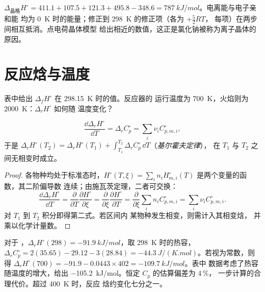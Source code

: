 \begin{example}[氯化钠]\label{ex:b2:reaction-enthalpy:nacl}
$\Delta_{\text{晶格}}H^\circ = 411.1 + 107.5 + 121.3 + 495.8 - 348.6 =
\qty{787}{kJ/mol}$。电离能与电子亲和能
均为 \qty{0}{K} 时的能量；修正到 \qty{298}{K} 的修正项（各为 $+\tfrac52RT$，
每项）在两步间相互抵消。点电荷晶体模型
给出相近的数值，这正是氯化钠被称为离子晶体的原因。
\end{example}

\section{反应焓与温度}

表中给出 $\Delta_f H^\circ$ 在 \qty{298.15}{K} 时的值。反应器的
运行温度为 \qty{700}{K}，火焰则为 \qty{2000}{K}：$\Delta_r H^\circ$ 如何随
温度变化？

\begin{theorem}[基尔霍夫定律]\label{thm:b2:reaction-enthalpy:kirchhoff}
\[
  \frac{\dd\Delta_r H^\circ}{\dd T} = \Delta_r C_p^\circ =
  \sum_i\nu_i C_{p,m,i}^\circ ,
\]
于是 $\Delta_r H^\circ(T_2) = \Delta_r H^\circ(T_1) + \int_{T_1}^{T_2}
\Delta_r C_p^\circ\,\dd T$（\emph{基尔霍夫定律}），
在 $T_1$ 与 $T_2$ 之间无相变时成立。
\end{theorem}

\begin{proof}
各物种均处于标准态时，$H^\circ(T, \xi) = \sum_in_i
H^\circ_{m,i}(T)$ 是两个变量的函数，其二阶偏导数
连续；由施瓦茨定理，二者可交换：
\[
  \frac{\dd\Delta_r H^\circ}{\dd T} = \frac{\partial}{\partial T}
  \frac{\partial H^\circ}{\partial\xi} = \frac{\partial}{\partial\xi}
  \frac{\partial H^\circ}{\partial T} = \frac{\partial}{\partial\xi}
  \sum_in_iC^\circ_{p,m,i} = \sum_i\nu_iC^\circ_{p,m,i}.
\]
对 $T_1$ 到 $T_2$ 积分即得第二式。若区间内
某物种发生相变，则需计入其相变焓，
并乘以化学计量数。
\end{proof}

\begin{example}[高温下的合成氨]\label{ex:b2:reaction-enthalpy:kirchhoff}
对于 ，$\Delta_r H^\circ(298) =
\qty{-91.9}{kJ/mol}$，取 \qty{298}{K} 时的热容，
$\Delta_r C_p^\circ = 2(35.65) - 29.12 - 3(28.84) =
\qty{-44.3}{J/(K.mol)}$。若视为常数，则得 $\Delta_r
H^\circ(700) = -91.9 - 0.0443 \times 402 = \qty{-109.7}{kJ/mol}$。表中
数据考虑了热容随温度的增大，给出
\qty{-105.2}{kJ/mol}。恒定 $C_p$ 的估算偏差为 4\,\%，
一步计算的合理代价。超过 \qty{400}{K} 时，反应
焓约变化七分之一。
\end{example}

